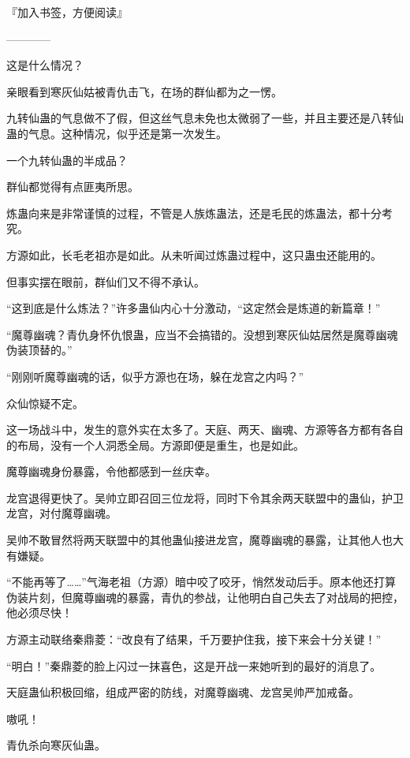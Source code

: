 
\begin{this_body}

『加入书签，方便阅读』

------------

这是什么情况？

亲眼看到寒灰仙姑被青仇击飞，在场的群仙都为之一愣。

九转仙蛊的气息做不了假，但这丝气息未免也太微弱了一些，并且主要还是八转仙蛊的气息。这种情况，似乎还是第一次发生。

一个九转仙蛊的半成品？

群仙都觉得有点匪夷所思。

炼蛊向来是非常谨慎的过程，不管是人族炼蛊法，还是毛民的炼蛊法，都十分考究。

方源如此，长毛老祖亦是如此。从未听闻过炼蛊过程中，这只蛊虫还能用的。

但事实摆在眼前，群仙们又不得不承认。

“这到底是什么炼法？”许多蛊仙内心十分激动，“这定然会是炼道的新篇章！”

“魔尊幽魂？青仇身怀仇恨蛊，应当不会搞错的。没想到寒灰仙姑居然是魔尊幽魂伪装顶替的。”

“刚刚听魔尊幽魂的话，似乎方源也在场，躲在龙宫之内吗？”

众仙惊疑不定。

这一场战斗中，发生的意外实在太多了。天庭、两天、幽魂、方源等各方都有各自的布局，没有一个人洞悉全局。方源即便是重生，也是如此。

魔尊幽魂身份暴露，令他都感到一丝庆幸。

龙宫退得更快了。吴帅立即召回三位龙将，同时下令其余两天联盟中的蛊仙，护卫龙宫，对付魔尊幽魂。

吴帅不敢冒然将两天联盟中的其他蛊仙接进龙宫，魔尊幽魂的暴露，让其他人也大有嫌疑。

“不能再等了……”气海老祖（方源）暗中咬了咬牙，悄然发动后手。原本他还打算伪装片刻，但魔尊幽魂的暴露，青仇的参战，让他明白自己失去了对战局的把控，他必须尽快！

方源主动联络秦鼎菱：“改良有了结果，千万要护住我，接下来会十分关键！”

“明白！”秦鼎菱的脸上闪过一抹喜色，这是开战一来她听到的最好的消息了。

天庭蛊仙积极回缩，组成严密的防线，对魔尊幽魂、龙宫吴帅严加戒备。

嗷吼！

青仇杀向寒灰仙蛊。


\end{this_body}
